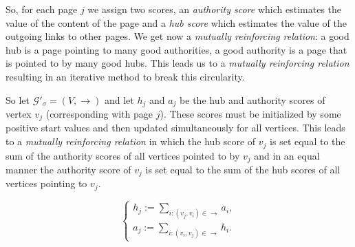 \documentclass[a4paper,11pt]{report}
\newcommand{\graf}{\mathscr{G}}
\begin{document}
 So, for each page $j$ we assign two scores, an \textit{authority score} 
 which estimates the value of the content of the page and a \textit{hub 
 score} which estimates the value of the outgoing links to other pages. We get now a\textit{ mutually reinforcing 
 relation}: a good hub is a page pointing to many good authorities, a good 
 authority is a page that is pointed to by many good hubs. This leads us to a 
 \textit{mutually reinforcing relation}  resulting in an iterative method to 
 break this circularity.
 
So let $\graf'_\sigma = (V,\to)$ and let $h_j$ and $a_j$ be the hub and authority 
scores of vertex $v_j$ (corresponding with page $j$). These scores must be initialized by some positive start values 
and then updated simultaneously for all vertices. This leads to a \emph{mutually reinforcing relation} 
in which the hub score of $v_j$ is set equal to the sum of the authority scores of all 
vertices pointed to by $v_j$ and in an equal manner the authority score of $v_j$ 
is set equal to the sum of the hub scores of all vertices pointing to $v_j$.

$$\begin{cases} h_j := \sum_{i:(v_j,v_i)\in \to} a_i,\\ 
a_j := \sum_{i:(v_i,v_j)\in \to} h_i.
\end{cases}$$ 
\end{document}
